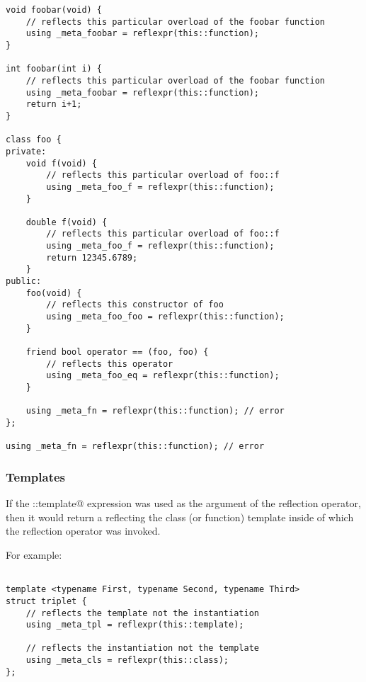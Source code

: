 \begin{verbatim}
void foobar(void) {
	// reflects this particular overload of the foobar function
	using _meta_foobar = reflexpr(this::function);
}

int foobar(int i) {
	// reflects this particular overload of the foobar function
	using _meta_foobar = reflexpr(this::function);
	return i+1;
}

class foo {
private:
	void f(void) {
		// reflects this particular overload of foo::f
		using _meta_foo_f = reflexpr(this::function);
	}

	double f(void) {
		// reflects this particular overload of foo::f
		using _meta_foo_f = reflexpr(this::function);
		return 12345.6789;
	}
public:
	foo(void) {
		// reflects this constructor of foo
		using _meta_foo_foo = reflexpr(this::function);
	}

	friend bool operator == (foo, foo) {
		// reflects this operator
		using _meta_foo_eq = reflexpr(this::function);
	}

	using _meta_fn = reflexpr(this::function); // error
};

using _meta_fn = reflexpr(this::function); // error
\end{verbatim}

\subsubsection{Templates}

If the \verb@this::template@ expression was used as the argument of the reflection
operator, then it would return a  reflecting the class (or function)
template inside of which the reflection operator was invoked.

For example:

\begin{verbatim}

template <typename First, typename Second, typename Third>
struct triplet {
	// reflects the template not the instantiation
	using _meta_tpl = reflexpr(this::template);

	// reflects the instantiation not the template
	using _meta_cls = reflexpr(this::class);
};
\end{verbatim}
